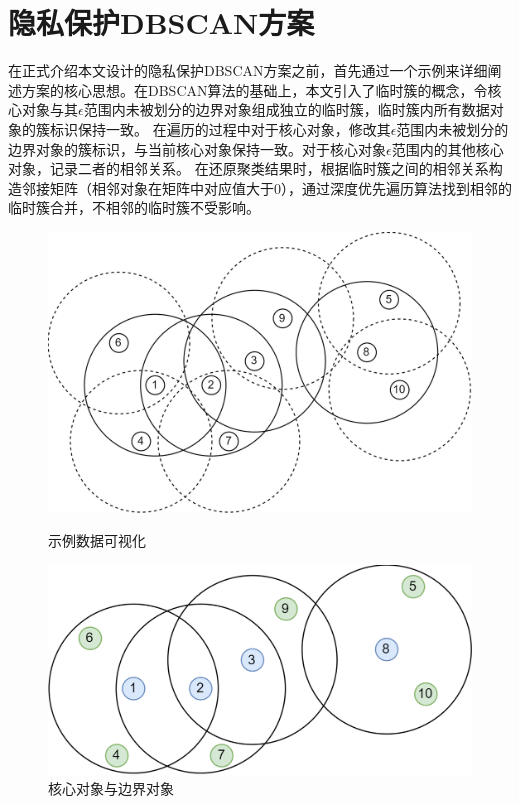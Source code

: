 \section{隐私保护DBSCAN方案}
\label{s4-t1}
在正式介绍本文设计的隐私保护DBSCAN方案之前，首先通过一个示例来详细阐述方案的核心思想。在DBSCAN算法的基础上，本文引入了临时簇的概念，令核心对象与其$ \epsilon $范围内未被划分的边界对象组成独立的临时簇，临时簇内所有数据对象的簇标识保持一致。
在遍历的过程中对于核心对象，修改其$ \epsilon $范围内未被划分的边界对象的簇标识，与当前核心对象保持一致。对于核心对象$ \epsilon $范围内的其他核心对象，记录二者的相邻关系。
在还原聚类结果时，根据临时簇之间的相邻关系构造邻接矩阵（相邻对象在矩阵中对应值大于0），通过深度优先遍历算法找到相邻的临时簇合并，不相邻的临时簇不受影响。

\begin{figure}[htbp]
	\begin{minipage}[t]{0.48\linewidth}
		\centering
		\includegraphics[width=\linewidth]{img/dbraw.png}
		\caption{示例数据可视化}
		\label{dataraw}
	\end{minipage}
	\hfill
	\begin{minipage}[t]{0.48\linewidth}
		\centering
		\includegraphics[width=\linewidth]{img/db1.png}
		\caption{核心对象与边界对象}
		\label{dbraw}
	\end{minipage}
\end{figure}

